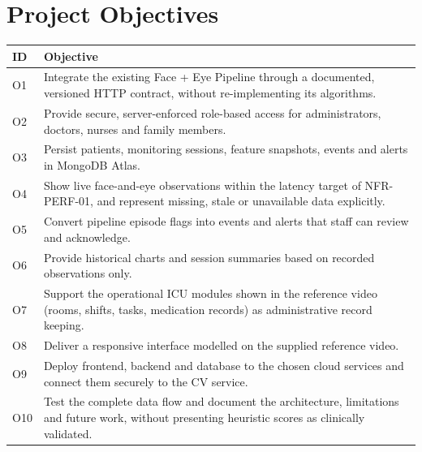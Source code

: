 \documentclass[a4paper,11pt]{scrreprt}
\begin{document}
\section{Project Objectives}
\begin{tabularx}{\textwidth}{@{}l>{\raggedright\arraybackslash}X@{}}
\toprule
\textbf{ID} & \textbf{Objective}\\ \midrule
O1 & Integrate the existing Face + Eye Pipeline through a documented, versioned HTTP contract, without re-implementing its algorithms.\\
O2 & Provide secure, server-enforced role-based access for administrators, doctors, nurses and family members.\\
O3 & Persist patients, monitoring sessions, feature snapshots, events and alerts in MongoDB Atlas.\\
O4 & Show live face-and-eye observations within the latency target of NFR-PERF-01, and represent missing, stale or unavailable data explicitly.\\
O5 & Convert pipeline episode flags into events and alerts that staff can review and acknowledge.\\
O6 & Provide historical charts and session summaries based on recorded observations only.\\
O7 & Support the operational ICU modules shown in the reference video (rooms, shifts, tasks, medication records) as administrative record keeping.\\
O8 & Deliver a responsive interface modelled on the supplied reference video.\\
O9 & Deploy frontend, backend and database to the chosen cloud services and connect them securely to the CV service.\\
O10 & Test the complete data flow and document the architecture, limitations and future work, without presenting heuristic scores as clinically validated.\\
\bottomrule
\end{tabularx}
\end{document}
